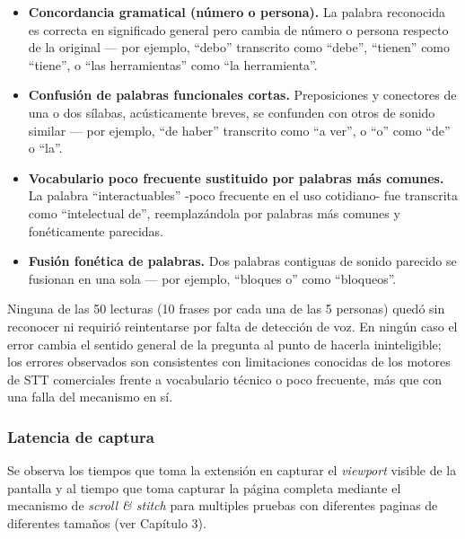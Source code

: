 \begin{itemize}
    \item \textbf{Concordancia gramatical (número o persona).} La palabra reconocida es correcta en significado general pero cambia de número o persona respecto de la original — por ejemplo, ``debo'' transcrito como ``debe'', ``tienen'' como ``tiene'', o ``las herramientas'' como ``la herramienta''.
    \item \textbf{Confusión de palabras funcionales cortas.} Preposiciones y conectores de una o dos sílabas, acústicamente breves, se confunden con otros de sonido similar — por ejemplo, ``de haber'' transcrito como ``a ver'', o ``o'' como ``de'' o ``la''.
    \item \textbf{Vocabulario poco frecuente sustituido por palabras más comunes.} La palabra ``interactuables'' -poco frecuente en el uso cotidiano- fue transcrita como ``intelectual de'', reemplazándola por palabras más comunes y fonéticamente parecidas.
    \item \textbf{Fusión fonética de palabras.} Dos palabras contiguas de sonido parecido se fusionan en una sola — por ejemplo, ``bloques o'' como ``bloqueos''.
\end{itemize}

Ninguna de las 50 lecturas (10 frases por cada una de las 5 personas) quedó sin reconocer ni requirió reintentarse por falta de detección de voz. En ningún caso el error cambia el sentido general de la pregunta al punto de hacerla ininteligible; los errores observados son consistentes con limitaciones conocidas de los motores de STT comerciales frente a vocabulario técnico o poco frecuente, más que con una falla del mecanismo en sí.

\subsubsection{Latencia de captura}

Se observa los tiempos que toma la extensión en capturar el \textit{viewport} visible de la pantalla y al tiempo que toma capturar la página completa mediante el mecanismo de \textit{scroll \& stitch} para multiples pruebas con diferentes paginas de diferentes tamaños (ver Capítulo 3).


